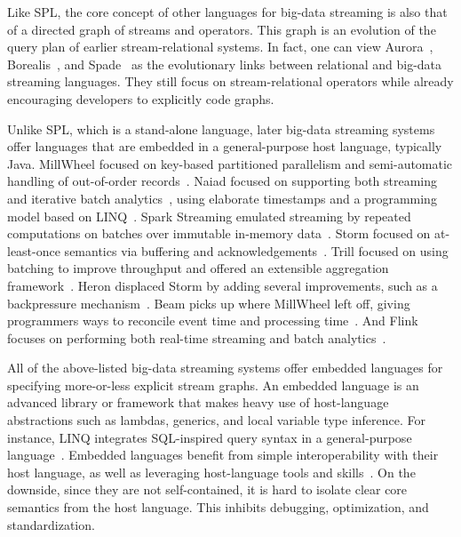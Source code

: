 Like SPL, the core concept of other languages for big-data streaming
is also that of a directed graph of streams and operators. This graph
is an evolution of the query plan of earlier stream-relational
systems. In fact, one can view \textsf{Aurora}~\cite{abadi_et_al_2003},
\textsf{Borealis}~\cite{abadi_et_al_2005}, and
\textsf{Spade}~\cite{gedik_et_al_2008} as the evolutionary links
between relational and big-data streaming languages. They still focus
on stream-relational operators while already encouraging developers to
explicitly code graphs.

Unlike SPL, which is a stand-alone language, later big-data streaming
systems offer languages that are embedded in a general-purpose host
language, typically Java. \textsf{MillWheel} focused on key-based
partitioned parallelism and semi-automatic handling of out-of-order
records~\cite{akidau_et_al_2013}. \textsf{Naiad} focused on supporting
both streaming and iterative batch analytics~\cite{murray_et_al_2013},
using elaborate timestamps and a programming model based on
LINQ~\cite{meijer_beckman_bierman_2006}.  \textsf{Spark Streaming}
emulated streaming by repeated computations on batches over immutable
in-memory data~\cite{zaharia_et_al_2013}. \textsf{Storm} focused on
at-least-once semantics via buffering and
acknowledgements~\cite{toshniwal_et_al_2014}.  \textsf{Trill} focused
on using batching to improve throughput and offered an extensible
aggregation framework~\cite{chandramouli_et_al_2014}.  \textsf{Heron}
displaced Storm by adding several improvements, such as a backpressure
mechanism~\cite{kulkarni_et_al_2015}. \textsf{Beam} picks up where
MillWheel left off, giving programmers ways to reconcile event time
and processing time~\cite{akidau_et_al_2015}. And \textsf{Flink}
focuses on performing both real-time streaming and batch
analytics~\cite{carbone_et_al_2015}.

All of the above-listed big-data streaming systems offer embedded
languages for specifying more-or-less explicit stream graphs. An
embedded language is an advanced library or framework that makes heavy
use of host-language abstractions such as lambdas, generics, and local
variable type inference. For instance, LINQ integrates SQL-inspired
query syntax in a general-purpose
language~\cite{meijer_beckman_bierman_2006}.  Embedded languages
benefit from simple interoperability with their host language, as well
as leveraging host-language tools and skills~\cite{hudak_1998}. On the
downside, since they are not self-contained, it is hard to isolate
clear core semantics from the host language. This
inhibits debugging, optimization, and standardization.
